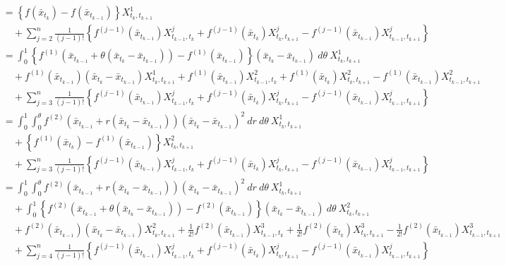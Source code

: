 \begin{prf}
\begin{align}
			&= \left\{ f(\bar{x}_{t_k}) - f(\bar{x}_{t_{k-1}}) \right\} X^1_{t_k,t_{k+1}} \\
				&\quad + \sum_{j=2}^n \frac{1}{(j-1)!} \left\{ f^{(j-1)}(\bar{x}_{t_{k-1}})X^j_{t_{k-1},t_k} + f^{(j-1)}(\bar{x}_{t_k})X^j_{t_k,t_{k+1}} - f^{(j-1)}(\bar{x}_{t_{k-1}})X^j_{t_{k-1},t_{k+1}} \right\} \\
			&= \int_0^1 \left\{ f^{(1)}(\bar{x}_{t_{k-1}} + \theta(\bar{x}_{t_k} - \bar{x}_{t_{k-1}})) - f^{(1)}(\bar{x}_{t_{k-1}})\right\}(\bar{x}_{t_k} - \bar{x}_{t_{k-1}})\ d\theta\ X^1_{t_k,t_{k+1}} \\
				&\quad + f^{(1)}(\bar{x}_{t_{k-1}})(\bar{x}_{t_k} - \bar{x}_{t_{k-1}})X^1_{t_k,t_{k+1}}
					+ f^{(1)}(\bar{x}_{t_{k-1}})X^2_{t_{k-1},t_k} + f^{(1)}(\bar{x}_{t_k})X^2_{t_k,t_{k+1}} - f^{(1)}(\bar{x}_{t_{k-1}})X^2_{t_{k-1},t_{k+1}} \\
				&\quad + \sum_{j=3}^n \frac{1}{(j-1)!} \left\{ f^{(j-1)}(\bar{x}_{t_{k-1}})X^j_{t_{k-1},t_k} + f^{(j-1)}(\bar{x}_{t_k})X^j_{t_k,t_{k+1}} - f^{(j-1)}(\bar{x}_{t_{k-1}})X^j_{t_{k-1},t_{k+1}} \right\} \\
			&= \int_0^1 \int_0^{\theta} f^{(2)}(\bar{x}_{t_{k-1}} + r(\bar{x}_{t_k} - \bar{x}_{t_{k-1}}))(\bar{x}_{t_k} - \bar{x}_{t_{k-1}})^2\ dr\ d\theta\ X^1_{t_k,t_{k+1}} \\
				&\quad + \left\{ f^{(1)}(\bar{x}_{t_k}) - f^{(1)}(\bar{x}_{t_{k-1}}) \right\} X^2_{t_k,t_{k+1}} \\
				&\quad + \sum_{j=3}^n \frac{1}{(j-1)!} \left\{ f^{(j-1)}(\bar{x}_{t_{k-1}})X^j_{t_{k-1},t_k} + f^{(j-1)}(\bar{x}_{t_k})X^j_{t_k,t_{k+1}} - f^{(j-1)}(\bar{x}_{t_{k-1}})X^j_{t_{k-1},t_{k+1}} \right\} \\
			&= \int_0^1 \int_0^{\theta} f^{(2)}(\bar{x}_{t_{k-1}} + r(\bar{x}_{t_k} - \bar{x}_{t_{k-1}}))(\bar{x}_{t_k} - \bar{x}_{t_{k-1}})^2\ dr\ d\theta\ X^1_{t_k,t_{k+1}} \\
				&\quad + \int_0^1 \left\{ f^{(2)}(\bar{x}_{t_{k-1}} + \theta(\bar{x}_{t_k}-\bar{x}_{t_{k-1}})) - f^{(2)}(\bar{x}_{t_{k-1}}) \right\}(\bar{x}_{t_k}-\bar{x}_{t_{k-1}})\ d\theta\ X^2_{t_k,t_{k+1}} \\
				&\quad + f^{(2)}(\bar{x}_{t_{k-1}}) (\bar{x}_{t_k}-\bar{x}_{t_{k-1}}) X^2_{t_k,t_{k+1}}
					+ \frac{1}{2!} f^{(2)}(\bar{x}_{t_{k-1}})X^3_{t_{k-1},t_k} + \frac{1}{2!} f^{(2)}(\bar{x}_{t_k})X^3_{t_k,t_{k+1}} - \frac{1}{2!} f^{(2)}(\bar{x}_{t_{k-1}})X^3_{t_{k-1},t_{k+1}} \\
				&\quad + \sum_{j=4}^n \frac{1}{(j-1)!} \left\{ f^{(j-1)}(\bar{x}_{t_{k-1}})X^j_{t_{k-1},t_k} + f^{(j-1)}(\bar{x}_{t_k})X^j_{t_k,t_{k+1}} - f^{(j-1)}(\bar{x}_{t_{k-1}})X^j_{t_{k-1},t_{k+1}} \right\} \\

\end{align}
\end{prf}

